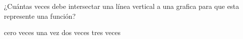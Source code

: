 
\question ¿Cuántas veces debe intersectar una línea vertical a una grafica
          para que esta represente una función?

  \begin{oneparchoices}
    \choice cero veces
    \CorrectChoice una vez
    \choice dos veces
    \choice tres veces
  \end{oneparchoices}
